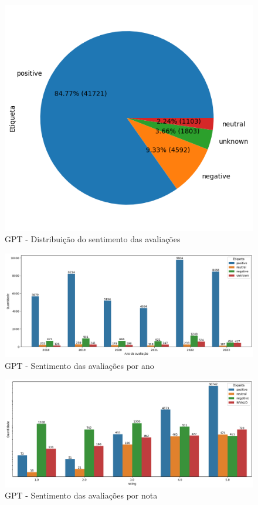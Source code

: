 \begin{figure}
	\centering
	\includegraphics{figs/gpt/distribuicao_pizza.png}
	\caption{GPT - Distribuição do sentimento das avaliações}
	\label{img:gpt_pizza_distribuicao}
\end{figure}
\begin{figure}
	\centering
	\includegraphics[width=1\textwidth]{figs/gpt/sentimento_ano.png}
	\caption{GPT - Sentimento das avaliações por ano}
	\label{img:gpt_sentimento_ano}
\end{figure}
\begin{figure}
	\centering
	\includegraphics[width=1\textwidth]{figs/gpt/sentimento_nota.png}
	\caption{GPT - Sentimento das avaliações por nota}
	\label{img:gpt_sentimento_nota}
\end{figure}


